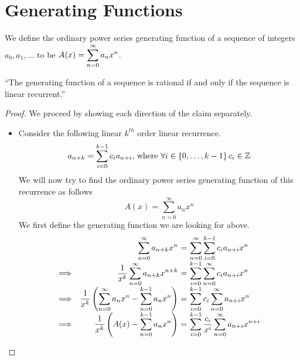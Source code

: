     \section{Generating Functions}
        \begin{definition}
            We define the ordinary power series generating function of a sequence of integers
            $a_0, a_1, \dots$ to be $A(x) = \displaystyle\sum_{n = 0}^{\infty} a_n x^n$.
        \end{definition}
        \begin{theorem}
            ``The generating function of a sequence is rational if and only if the sequence is linear recurrent.''
        \end{theorem}
        \begin{proof}
            We proceed by showing each direction of the claim separately.
            \begin{itemize}
                \item
                    Consider the following linear $k^{th}$ order linear recurrence.
                    \begin{equation}
                        a_{n + k}= \sum_{i = 0}^{k - 1} c_i a_{n + i} \mbox{, where $\forall i \in \left\{0, \dots, k - 1\right\} c_i \in \mathbb{Z}$}
                    \end{equation}
                    We will now try to find the ordinary power series generating function of this recurrence
                    as follows
                    \begin{equation}
                        A(x) = \sum_{n = 0}^{\infty} a_n x^n
                    \end{equation}
                    We first define the generating function we are looking for above.
                    \[\begin{array}{cr@{\ = \ }l}
                              & \dsum_{n = 0}^{\infty} a_{n + k} x^n  & \dsum_{n = 0}^{\infty} \dsum_{i = 0}^{k - 1} c_i a_{n + i} x^n \\
                        \then & \dfrac{1}{x^k} \dsum_{n = 0}^{\infty} a_{n + k} x^{n + k} & \dsum_{i = 0}^{k - 1} \dsum_{n = 0}^{\infty} c_i a_{n + i} x^n \\
                        \then & \dfrac{1}{x^k} \left(\dsum_{n = 0}^{\infty} a_n x^n - \dsum_{n = 0}^{k - 1} a_n x^n\right) & \dsum_{i = 0}^{k - 1} c_i \dsum_{n = 0}^{\infty} a_{n + i} x^n \\
                        \then & \dfrac{1}{x^k} \left(A(x) - \dsum_{n = 0}^{k - 1} a_n x^n\right) & \dsum_{i = 0}^{k - 1} \dfrac{c_i}{x^i} \dsum_{n = 0}^{\infty} a_{n + i} x^{n + i} \\

\end{array}\]
\end{itemize}
\end{proof}
